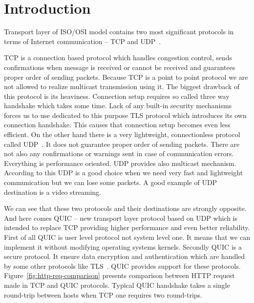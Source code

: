 
\section{Introduction}
\label{sec:introduction}

Transport layer of ISO/OSI model contains two most significant protocols in terms of
Internet communication -- TCP and UDP~.

TCP is a connection based protocol which handles congestion control, sends confirmations
when message is received or cannot be received and guarantees proper order of sending
packets.
Because TCP is a point to point protocol we are not allowed to realize multicast
transmission using it.
The biggest drawback of this protocol is its heaviness.
Connection setup requires so called three way handshake which takes some time.
Lack of any built-in security mechanisms forces us to use dedicated to this purpose
TLS protocol which introduces its own connection handshake.
This causes that connection setup becomes even less efficient.
On the other hand there is a very lightweight, connectionless protocol called UDP~.
It does not guarantee proper order of sending packets.
There are not also any confirmations or warnings sent in case of communication errors.
Everything is performance oriented.
UDP provides also multicast mechanism.
According to this UDP is a good choice when we need very fast and lightweight
communication but we can lose some packets.
A good example of UDP destination is a video streaming.

We can see that these two protocols and their destinations are strongly opposite.
And here comes QUIC -- new transport layer protocol based on UDP which is intended
to replace TCP providing higher performance and even better reliability.
First of all QUIC is user level protocol not system level one.
It means that we can implement it without modifying operating systems kernels.
Secondly QUIC is a secure protocol.
It ensure data encryption and authentication which are handled by some other
protocols like TLS~.
QUIC provides support for these protocols.
Figure~\ref{fig:http-req-comparison} presents comparison between HTTP request
made in TCP and QUIC protocols.
Typical QUIC handshake takes a single round-trip between hosts when TCP one requires
two round-trips.

